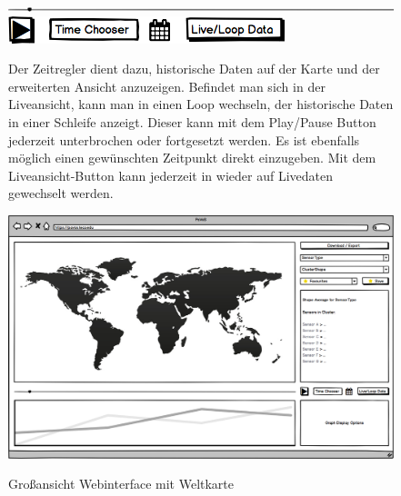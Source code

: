 \begin{figure}[H]
	\centering
	\includegraphics[width=0.69\linewidth]{gui/frontend/FrontGUITimeSlider.png}
	\hspace{0.1cm}
	\includegraphics[width=0.21\linewidth]{gui/frontend/FrontGUITimeSetter.png}
	\caption{Der Zeitregler dient dazu, historische Daten auf der Karte und der erweiterten Ansicht anzuzeigen. Befindet man sich in der Liveansicht, kann man in einen Loop wechseln, der historische Daten in einer Schleife anzeigt. Dieser kann mit dem Play/Pause Button jederzeit unterbrochen oder fortgesetzt werden. Es ist ebenfalls möglich einen gewünschten Zeitpunkt direkt einzugeben. Mit dem Liveansicht-Button kann jederzeit in wieder auf Livedaten gewechselt werden.}
\end{figure}
\newpage
\begin{figure}[H]
	\centering
	\includegraphics[height=\linewidth, angle=90]{gui/frontend/FrontGUIWorld.png}\\
	\caption{Großansicht Webinterface mit Weltkarte}
\end{figure}